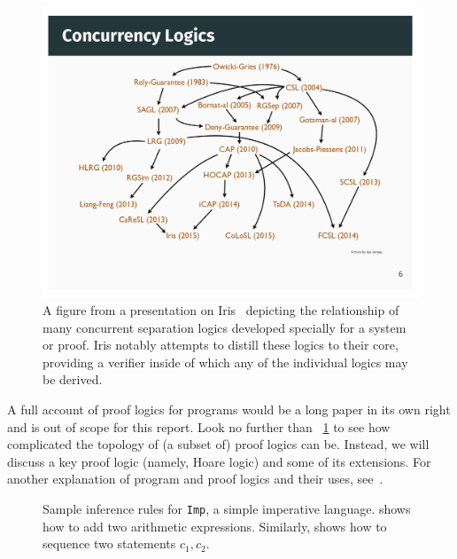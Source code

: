 \begin{figure}[ht]
    \centering
    \includegraphics[width=\textwidth]{img/iris_2_0_concurrent_logics}
    \caption{A figure from a presentation on Iris~\cite{Jung_2016_slides}
    depicting the relationship of many concurrent separation logics developed
    specially for a system or proof. Iris notably attempts to distill these
    logics to their core, providing a verifier inside of which any of the
    individual logics may be derived.}\label{F:iris_complex}
\end{figure}

A full account of proof logics for programs would be a long paper in its own
right and is out of scope for this report. Look no further than
\figurename~\ref{F:iris_complex} to see how complicated the topology of (a
subset of) proof logics can be. Instead, we will discuss a key proof logic
(namely, Hoare logic) and some of its extensions. For another explanation of
program and proof logics and their uses, see~\cite[\S 5]{Appel_2011}.

\begin{figure}[ht]
    \centering
    \caption{Sample inference rules for \texttt{Imp}, a simple imperative
    language.  shows how to add two arithmetic expressions.
    Similarly,  shows how to sequence two statements \(c_1,
    c_2\).}\label{F:Imp_ex}
\end{figure}

